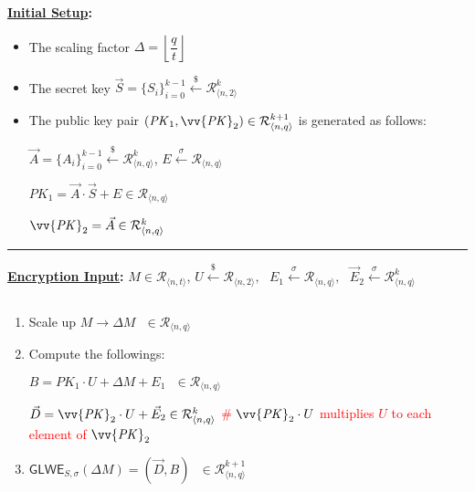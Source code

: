 \begin{tcolorbox}[title={\textbf{\tboxlabel{\ref*{subsec:glwe-enc}} GLWE Public Key Encryption}}]

\textbf{\underline{Initial Setup}:} 
\begin{itemize}
\item The scaling factor $\Delta = \left\lfloor\dfrac{q}{t}\right\rfloor$
\item The secret key $\vec{S} = \{S_i\}_{i=0}^{k-1} \xleftarrow{\$} \mathcal{R}_{\langle n, 2 \rangle}^k$
\item The public key pair $(\mathit{PK}_1, \vv{\mathit{PK}}_2) \in \mathcal{R}_{\langle n, q \rangle}^{k+1}$ is generated as follows:

$\vec{A} = \{A_i\}_{i=0}^{k-1} \xleftarrow{\$} \mathcal{R}_{\langle n, q \rangle}^k$, \text{ } $E \xleftarrow{\sigma} \mathcal{R}_{\langle n, q \rangle}$

$\mathit{PK}_1 = \vec{A} \cdot \vec{S} + E \in \mathcal{R}_{\langle n, q \rangle}$

$\vv{\mathit{PK}}_2 = \vec{A} \in \mathcal{R}_{\langle n, q \rangle}^{k}$

\end{itemize}

\par\noindent\rule{\textwidth}{0.4pt}

\textbf{\underline{Encryption Input}:} $M \in \mathcal{R}_{\langle n, t \rangle}$, \text{ } $U \xleftarrow{\$} \mathcal{R}_{\langle n,2 \rangle}, \text{ } E_1 \xleftarrow{\sigma} \mathcal{R}_{\langle n,q \rangle}, \text{ } \vec{E}_2 \xleftarrow{\sigma} \mathcal{R}_{\langle n,q \rangle}^k$

$ $

\begin{enumerate}

\item Scale up $M \longrightarrow \Delta M \text { } \in \mathcal{R}_{\langle n, q\rangle}$

\item Compute the followings: 

$B = \mathit{PK}_1\cdot U + \Delta  M + E_1 \text{ } \in \mathcal{R}_{\langle n,q \rangle}$

$\vec{D} = \vv{{\mathit{PK}}}_2 \cdot U + \vec{E}_2 \in \mathcal{R}_{\langle n,q \rangle}^{k}$ \textcolor{red}{\text{ } \# $\vv{\mathit{PK}}_2 \cdot U$ multiplies $U$ to each element of $\vv{\mathit{PK}}_2$}

\item $\textsf{GLWE}_{S,\sigma}(\Delta M) = (\vec{D}, B) \text{ } \in \mathcal{R}_{\langle n,q \rangle}^{k+1}$ 




\end{enumerate}
\end{tcolorbox}
